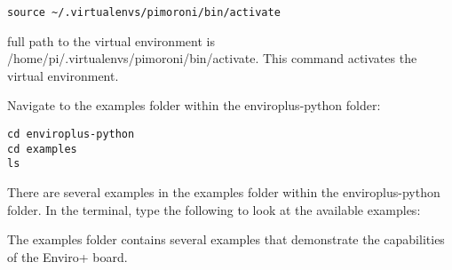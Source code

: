 \documentclass{article}
\begin{document}
\begin{verbatim}
source ~/.virtualenvs/pimoroni/bin/activate
\end{verbatim}

full path to the virtual environment is /home/pi/.virtualenvs/pimoroni/bin/activate. This command activates the virtual environment.

Navigate to the examples folder within the enviroplus-python folder:

\begin{verbatim}
cd enviroplus-python
cd examples
ls
\end{verbatim}

There are several examples in the examples folder within the enviroplus-python folder. In the terminal, type the following to look at the available examples:

The examples folder contains several examples that demonstrate the capabilities of the Enviro+ board.
\end{document}
